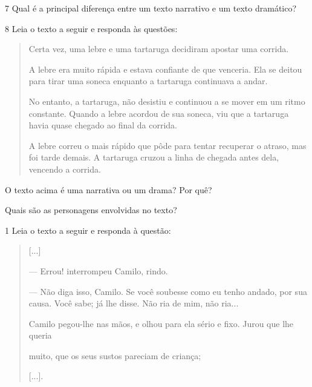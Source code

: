 \num{7} Qual é a principal diferença entre um texto narrativo e um texto dramático?



\num{8} Leia o texto a seguir e responda às questões:


\begin{quote}
Certa vez, uma lebre e uma tartaruga decidiram apostar uma corrida.

A lebre era muito rápida e estava confiante de que venceria. Ela se
deitou para tirar uma soneca enquanto a tartaruga continuava a andar.

No entanto, a tartaruga, não desistiu e continuou a se mover em um ritmo
constante. Quando a lebre acordou de sua soneca, viu que a tartaruga
havia quase chegado ao final da corrida.

A lebre correu o mais rápido que pôde para tentar recuperar o atraso,
mas foi tarde demais. A tartaruga cruzou a linha de chegada antes dela,
vencendo a corrida.
\end{quote}

\begin{escolha}
\item O texto acima é uma narrativa ou um drama? Por quê?



\item Quais são as personagens envolvidas no texto?

\end{escolha}



\num{1} Leia o texto a seguir e responda à questão:

\begin{quote}
{[}...{]}

--- Errou! interrompeu Camilo, rindo.

--- Não diga isso, Camilo. Se você soubesse como eu tenho andado, por
sua causa. Você sabe; já lhe disse. Não ria de mim, não ria...

Camilo pegou-lhe nas mãos, e olhou para ela sério e fixo. Jurou que lhe
queria

muito, que os seus sustos pareciam de criança;

{[}...{]}.

\end{quote}

